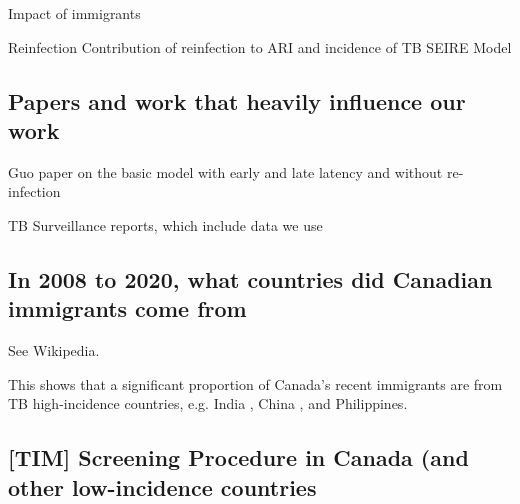 \documentclass[sn-mathphys,Numbered]{sn-jnl}%
\theoremstyle{thmstyleone}%
\theoremstyle{thmstyletwo}%
\theoremstyle{thmstylethree}%
\begin{document}
Impact of immigrants \cite{Inigo2007AnalysisImmigration}

Reinfection
Contribution of reinfection to ARI and incidence of TB \cite{Horsburgh2022ContributionDisease}
SEIRE Model\cite{Sulayman2023DynamicsIssues}


\subsection{Papers and work that heavily influence our work}

Guo paper on the basic model with early and late latency and  without re-infection \cite{Guo2011PersistentLatency}

TB Surveillance reports, which include data we use \cite{MounchiliA.2022TuberculosisReport}

\subsection{In 2008 to 2020, what countries did Canadian immigrants come from}

See Wikipedia.

This shows that a significant proportion of Canada’s recent immigrants are from TB high-incidence countries, e.g. India \cite{Varshney2023TrendsPandemic}, China \cite{Yu2020Estimating2025-2050}, and Philippines\cite{Capeding2022Cost2017}.

\subsection{[TIM] Screening Procedure in Canada (and other low-incidence countries} 
       
\end{document}
